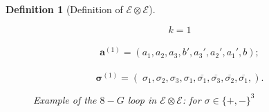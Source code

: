 \documentclass[10pt,reqno]{article}
\theoremstyle{plain} %
\newtheorem{definition}[theorem]{Definition}
\theoremstyle{remark}
\numberwithin{equation}{section}
\begin{document}
\begin{definition}[Definition of $\mathcal{E}\otimes  \mathcal{E}$]
\begin{figure}[ht]
\begin{minipage}{0.45\textwidth}
\begin{tikzpicture}[scale=1.0]
    \end{tikzpicture}
   
\end{minipage}%
\hfill
\begin{minipage}{0.45\textwidth} %
    \raggedright
    $$k=1 $$\\ 
    $$\textbf{a}^{(1 )}=( a_1, a_2, a_3, b', a_3', a_2', a_1',b);$$
    \\  
     $$\boldsymbol{\sigma}^{(1 )}=(\;\sigma_1, \sigma_2, \sigma_3,\sigma_1, \overline{\sigma_1},\overline{\sigma_3}, \overline{\sigma_2},\overline{\sigma_1}, ).$$
\end{minipage}
 \caption{Example of the $8-G$ loop in $\mathcal{E}\otimes  \mathcal{E}$: for $\sigma\in \{+,-\}^3$}
    \label{fig:8shapedgraph}
\end{figure}


\end{definition}

 
\end{document}
